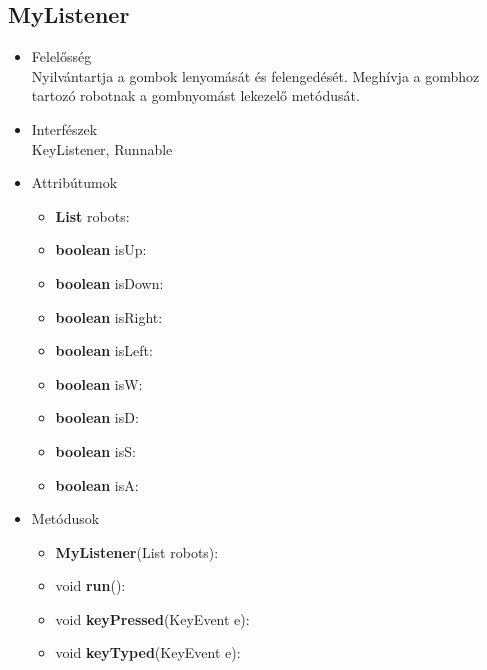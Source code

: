 \subsection{MyListener}
\begin{itemize}
\item Felelősség\\
Nyilvántartja a gombok lenyomását és felengedését. Meghívja a gombhoz tartozó robotnak a gombnyomást lekezelő metódusát.
\item Interfészek\\
KeyListener, Runnable
\item Attribútumok
	\begin{itemize}
	    \item \textbf{List} robots: 
		\item \textbf{boolean} isUp: 
		\item \textbf{boolean} isDown: 
		\item \textbf{boolean} isRight: 
		\item \textbf{boolean} isLeft: 
		\item \textbf{boolean} isW: 
		\item \textbf{boolean} isD: 
		\item \textbf{boolean} isS: 
		\item \textbf{boolean} isA: 
	\end{itemize}
\item Metódusok
	\begin{itemize}
		\item \textbf{MyListener}(List robots): 
		\item void \textbf{run}():  
		\item void \textbf{keyPressed}(KeyEvent e): 
		\item void \textbf{keyTyped}(KeyEvent e): 
	\end{itemize}
\end{itemize}

